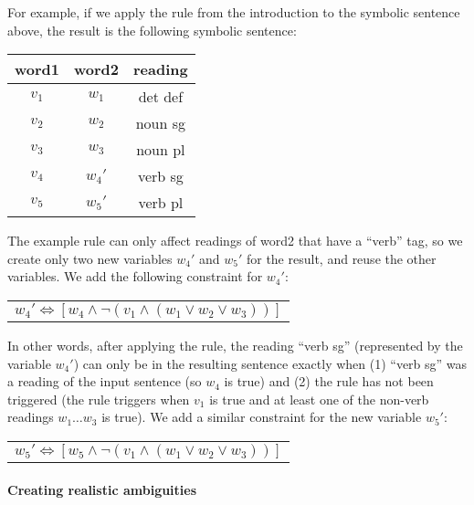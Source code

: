 For example, if we apply the rule from the introduction to the symbolic sentence above, the result is the following symbolic sentence:
\begin{center}
\begin{tabular}{c|c|c}
word1 & word2 & reading \\
\hline
$v_1$ & $w_1$ & det def \\
$v_2$ & $w_2$ & noun sg \\
$v_3$ & $w_3$ & noun pl \\
$v_4$ & $w_4'$ & verb sg \\
$v_5$ & $w_5'$ & verb pl \\
\end{tabular}
\end{center}
The example rule can only affect readings of word2 that have a ``verb'' tag, so we create only two new variables $w_4'$ and $w_5'$ for the result, and reuse the other variables. We add the following constraint for $w_4'$:
\begin{center}
\begin{tabular}{c}
$w_4' \Leftrightarrow [ w_4 \wedge \neg{}(v_1 \wedge (w_1 \vee w_2 \vee w_3)) ]$ \\
\end{tabular}
\end{center}
In other words, after applying the rule, the reading ``verb sg'' (represented by the variable $w_4'$) can only be in the resulting sentence exactly when (1) ``verb sg'' was a reading of the input sentence (so $w_4$ is true) and (2) the rule has not been triggered (the rule triggers when $v_1$ is true and at least one of the non-verb readings $w_1 \dots w_3$ is true). We add a similar constraint for the new variable $w_5'$:
\begin{center}
\begin{tabular}{c}
$w_5' \Leftrightarrow [ w_5 \wedge \neg{}(v_1 \wedge (w_1 \vee w_2 \vee w_3)) ]$ \\
\end{tabular}
\end{center}

\paragraph{Creating realistic ambiguities}


